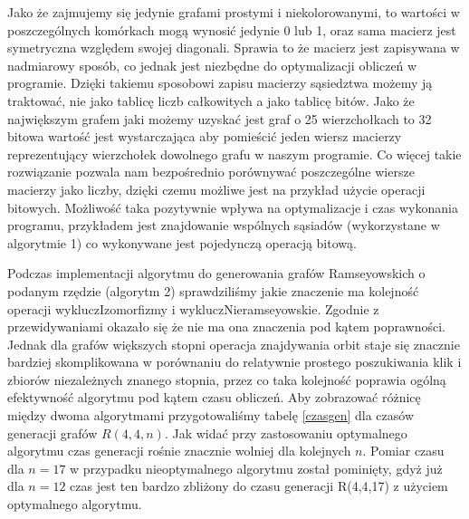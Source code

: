 Jako że zajmujemy się jedynie grafami prostymi i niekolorowanymi, to wartości w poszczególnych komórkach mogą wynosić jedynie 0 lub 1, oraz sama macierz jest symetryczna względem swojej diagonali. Sprawia to że macierz jest zapisywana w nadmiarowy sposób, co jednak jest niezbędne do optymalizacji obliczeń w programie. Dzięki takiemu sposobowi zapisu macierzy sąsiedztwa możemy ją traktować, nie jako tablicę liczb całkowitych a jako tablicę bitów. Jako że największym grafem jaki możemy uzyskać jest graf o 25 wierzchołkach to 32 bitowa wartość jest wystarczająca aby pomieścić jeden wiersz macierzy reprezentujący wierzchołek dowolnego grafu w naszym programie. Co więcej takie rozwiązanie pozwala nam bezpośrednio porównywać poszczególne wiersze macierzy jako liczby, dzięki czemu możliwe jest na przykład użycie operacji bitowych. Możliwość taka pozytywnie wpływa na optymalizacje i czas wykonania programu, przykładem jest znajdowanie wspólnych sąsiadów (wykorzystane w algorytmie 1) co wykonywane jest pojedynczą operacją bitową.

Podczas implementacji algorytmu do generowania grafów Ramseyowskich o podanym rzędzie (algorytm 2) sprawdziliśmy jakie znaczenie ma kolejność operacji wykluczIzomorfizmy i wykluczNieramseyowskie. Zgodnie z przewidywaniami okazało się że nie ma ona znaczenia pod kątem poprawności. Jednak dla grafów większych stopni operacja znajdywania orbit staje się znacznie bardziej skomplikowana w porównaniu do relatywnie prostego poszukiwania klik i zbiorów niezależnych znanego stopnia, przez co taka kolejność poprawia ogólną efektywność algorytmu pod kątem czasu obliczeń. Aby zobrazować różnicę między dwoma algorytmami przygotowaliśmy tabelę \ref{czasgen} dla czasów generacji grafów $R(4,4,n)$. Jak widać przy zastosowaniu optymalnego algorytmu czas generacji rośnie znacznie wolniej dla kolejnych $n$. Pomiar czasu dla $n=17$ w przypadku nieoptymalnego algorytmu został pominięty, gdyż już dla $n=12$ czas jest ten bardzo zbliżony do czasu generacji R(4,4,17) z użyciem optymalnego algorytmu.

